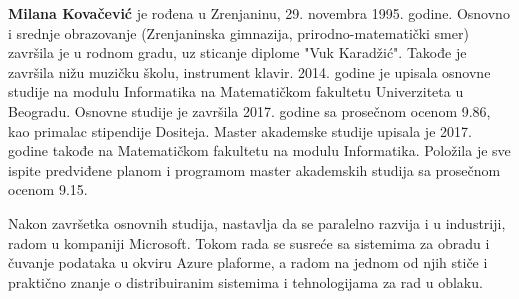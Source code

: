 \documentclass[12pt,oneside]{memoir}
\begin{document}
\begin{biografija}
  \textbf{Milana Kovačević} je rođena u Zrenjaninu, 29. novembra 1995. godine. Osnovno i srednje obrazovanje (Zrenjaninska gimnazija, prirodno-matematički smer) završila je u rodnom gradu, uz sticanje diplome "Vuk Karadžić". Takođe je završila nižu muzičku školu, instrument klavir.
2014. godine je upisala osnovne studije na modulu Informatika na Matematičkom fakultetu Univerziteta u Beogradu. Osnovne studije je završila 2017. godine sa prosečnom ocenom 9.86, kao primalac stipendije Dositeja. Master akademske studije upisala je 2017. godine takođe na Matematičkom fakultetu na modulu Informatika. Položila je sve ispite predviđene planom i programom master akademskih studija sa prosečnom ocenom 9.15.

Nakon završetka osnovnih studija, nastavlja da se paralelno razvija i u industriji, radom u kompaniji Microsoft. Tokom rada se susreće sa sistemima za obradu i čuvanje podataka u okviru Azure plaforme, a radom na jednom od njih stiče i praktično znanje o distribuiranim sistemima i tehnologijama za rad u oblaku.

\end{biografija}
\end{document}
